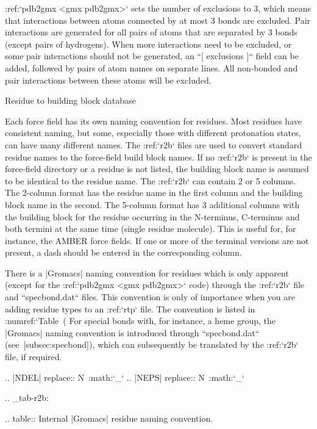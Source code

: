 :ref:`pdb2gmx <gmx pdb2gmx>` sets the number of exclusions to 3, which means
that interactions between atoms connected by at most 3 bonds are
excluded. Pair interactions are generated for all pairs of atoms that
are separated by 3 bonds (except pairs of hydrogens). When more
interactions need to be excluded, or some pair interactions should not
be generated, an ``[ exclusions ]`` field can be added,
followed by pairs of atom names on separate lines. All non-bonded and
pair interactions between these atoms will be excluded.

Residue to building block database
~~~~~~~~~~~~~~~~~~~~~~~~~~~~~~~~~~

Each force field has its own naming convention for residues. Most
residues have consistent naming, but some, especially those with
different protonation states, can have many different names. The
:ref:`r2b` files are used to convert standard residue names to
the force-field build block names. If no :ref:`r2b` is present
in the force-field directory or a residue is not listed, the building
block name is assumed to be identical to the residue name. The
:ref:`r2b` can contain 2 or 5 columns. The 2-column format has
the residue name in the first column and the building block name in the
second. The 5-column format has 3 additional columns with the building
block for the residue occurring in the N-terminus, C-terminus and both
termini at the same time (single residue molecule). This is useful for,
for instance, the AMBER force fields. If one or more of the terminal
versions are not present, a dash should be entered in the corresponding
column.

There is a |Gromacs| naming convention for residues which is only apparent
(except for the :ref:`pdb2gmx <gmx pdb2gmx>` code) through the
:ref:`r2b` file and ``specbond.dat`` files. This
convention is only of importance when you are adding residue types to an
:ref:`rtp` file. The convention is listed in :numref:`Table (%
For special bonds with, for instance,
a heme group, the |Gromacs| naming convention is introduced through
``specbond.dat`` (see [subsec:specbond]),
which can subsequently be translated by the :ref:`r2b` file,
if required.

.. |NDEL| replace:: N\ :math:`_\delta`
.. |NEPS| replace:: N\ :math:`_\epsilon`

.. _tab-r2b:

.. table:: Internal |Gromacs| residue naming convention.

